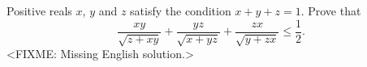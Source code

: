 \problem{}
Positive reals $x$, $y$ and $z$ satisfy the condition $x + y + z = 1$.
Prove that
\[
    \frac{x y}{\sqrt{z + x y}}
    +
    \frac{y z}{\sqrt{x + y z}}
    +
    \frac{z x}{\sqrt{y + z x}}
\leq
    \frac{1}{2}
.\]
\solution
<FIXME: Missing English solution.>
\endproblem
